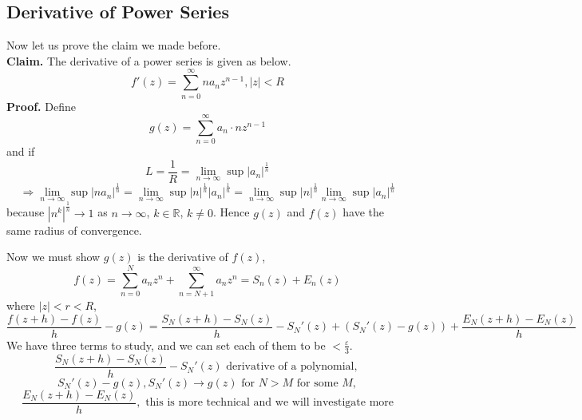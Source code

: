 \documentclass[11pt]{article}
\begin{document}
\subsection{Derivative of Power Series}
Now let us prove the claim we made before.\\ 
\textbf{Claim.} The derivative of a power series is given as below. 
$$f'(z) = \sum_{n = 0}^{\infty}na_nz^{n - 1}, |z| < R$$ 
\textbf{Proof.} Define 
$$g(z) = \sum_{n = 0}^{\infty} a_n\cdot nz^{n - 1}$$ 
and if 
$$ L = \frac{1}{R} = \lim_{n \to \infty}\sup |a_n|^{\frac{1}{n}} $$
$$ \Rightarrow \lim_{n \to \infty} \sup |na_n|^{\frac{1}{n}} = \lim_{n \to \infty}\sup |n|^{\frac{1}{n}}|a_n|^{\frac{1}{n}} = \lim_{n \to \infty}\sup|n|^{\frac{1}{n}}\lim_{n \to \infty} \sup |a_n|^{\frac{1}{n}}$$
because $|n^k|^{\frac{1}{n}} \to 1$ as $n \to \infty$, $k \in \mathbb{R}$, $k \neq 0$. Hence $g(z)$ and $f(z)$ have the same radius of convergence. 

Now we must show $g(z)$ is the derivative of $f(z)$, 
$$f(z) = \sum_{n = 0}^N a_nz^n + \sum_{n = N + 1}^{\infty} a_nz^n = S_n(z) + E_n(z)$$ 
where $|z| < r < R$, 
$$ \frac{f(z+h) -f(z)}{h} - g(z) = \frac{S_N(z + h) - S_N(z)}{h} - S_N'(z) + (S_N'(z) - g(z)) + \frac{E_N(z + h) - E_N(z)}{h}$$
We have three terms to study, and we can set each of them to be $< \frac{\varepsilon}{3}$.
\begin{equation*}
\frac{S_N(z + h) - S_N(z)}{h} - S_N'(z) \mbox{ derivative of a polynomial, } 
\end{equation*}
\begin{equation*}
S_N'(z) - g(z), S_N'(z) \to g(z) \mbox{ for } N > M \mbox{ for some } M,
\end{equation*}
\begin{equation*}
\frac{E_N(z + h) - E_N(z)}{h}, \mbox{ this is more technical and we will investigate more}
\end{equation*}
\end{document}
